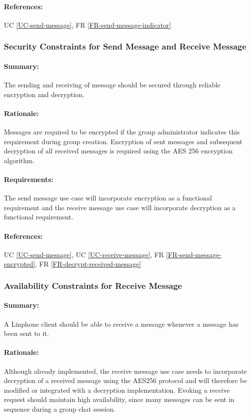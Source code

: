 \documentclass[11pt]{article}
\begin{document}
\paragraph{References:} UC \ref{UC-send-message}, FR \ref{FR-send-message-indicator}

\subsubsection{Security Constraints for Send Message and Receive Message} \label{NFR-security-send-message-and-receive-message}
\paragraph{Summary:} The sending and receiving of message should be secured through reliable encryption and decryption.
\paragraph{Rationale:} Messages are required to be encrypted if the group administrator indicates this requirement during group creation. Encryption of sent messages and subsequent decryption of all received messages is required using the AES 256 encryption algorithm. 
\paragraph{Requirements:} The send message use case will incorporate encryption as a functional requirement and the receive message use case will incorporate decryption as a functional requirement.
\paragraph{References:} UC \ref{UC-send-message}, UC \ref{UC-receive-message}, FR \ref{FR-send-message-encrypted}, FR \ref{FR-decrypt-received-message}

\subsubsection{Availability Constraints for Receive Message} \label{NFR-availability-receive-message}
\paragraph{Summary:} A Linphone client should be able to receive a message whenever a message has been sent to it.
\paragraph{Rationale:} Although already implemented, the receive message use case needs to incorporate decryption of a received message using the AES256 protocol and will therefore be modified or integrated with a decryption implementation. Evoking a receive request should maintain high availability, since many messages can be sent in sequence during a group chat session.
\end{document}
